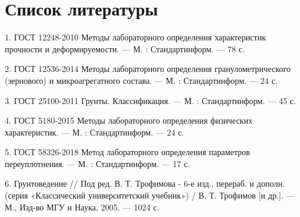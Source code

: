 
\chapter*{Список литературы}

1. ГОСТ 12248-2010 Методы лабораторного определения характеристик
прочности и деформируемости. --- М. : Стандартинформ. --- 78 с.

2. ГОСТ 12536-2014 Методы лабораторного определения гранулометрического
(зернового) и микроагрегатного состава. --- М. : Стандартинформ.
--- 24 с.

3. ГОСТ 25100-2011 Грунты. Классификация. --- М. : Стандартинформ.
--- 45 с.

4. ГОСТ 5180-2015 Методы лабораторного определения физических характеристик. --- М. 
: Стандартинформ. --- 24 с.

5. ГОСТ 58326-2018 Метод лабораторного определения параметров переуплотнения. --- М. 
: Стандартинформ. --- 17 с.

6. Грунтоведение // Под ред. В. Т. Трофимова - 6-е изд., перераб. и дополн.
(серия «Классический университетский учебник») / В. Т. Трофимов
[и др.]. — М., Изд-во МГУ и Наука, 2005. — 1024 с.

